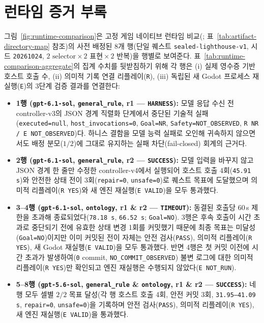 \documentclass[journal]{IEEEtran}
\begin{document}
\clearpage


\endgroup

\clearpage
\onecolumn
\appendices
\section{런타임 증거 부록}\label{app:runtime-evidence}
그림~\ref{fig:runtime-comparison}은 고정 게임 네이티브 런타임 비교(; 표~\ref{tab:artifact-directory-map} 참조)의 사전 배정된 8개 행(단일 퀘스트 \texttt{sealed-lighthouse-v1}, 시드 \texttt{20261024}, $2\text{ selector}\times 2\text{ 표현}\times 2\text{ 반복}$)을 행별로 보여준다. 표~\ref{tab:runtime-comparison-aggregate}의 집계 수치를 뒷받침하기 위해 각 행은 (i) 실제 영수증 기반 호스트 호출 수, (ii) 의미적 기록 연결 리플레이(\texttt{R}), (iii) 독립된 새 Godot 프로세스 재실행(\texttt{E})의 3단계 검증 결과를 연결한다:
\begin{itemize}
  \item \textbf{1행 (\texttt{gpt-6.1-sol}, \texttt{general\_rule}, r1 --- \texttt{HARNESS}):} 모델 응답 수신 전 controller-v3의 JSON 경계 직렬화 단계에서 중단된 기술적 실패(\texttt{executed=null}, \texttt{host\_invocations=0}, \texttt{Goal=NR}, \texttt{Safety=NOT\_OBSERVED}, \texttt{R NR / E NOT\_OBSERVED})다. 하니스 결함을 모델 능력 실패로 오인해 귀속하지 않으면서도 배정 분모($1/2$)에 그대로 유지하는 실패 차단(fail-closed) 회계의 근거다.
  \item \textbf{2행 (\texttt{gpt-6.1-sol}, \texttt{general\_rule}, r2 --- \texttt{SUCCESS}):} 모델 입력을 바꾸지 않고 JSON 경계 한 줄만 수정한 controller-v4에서 실행되어 호스트 호출 4회(\texttt{45.91\,s})와 안전한 상태 전이 3회(\texttt{repair=0}, \texttt{unsafe=0})로 퀘스트 목표에 도달했으며 의미적 리플레이(\texttt{R YES})와 새 엔진 재실행(\texttt{E VALID})을 모두 통과했다.
  \item \textbf{3--4행 (\texttt{gpt-6.1-sol}, \texttt{ontology}, r1 \& r2 --- \texttt{TIMEOUT}):} 동결된 호출당 60\,s 제한을 초과해 종료되었다(\texttt{78.18\,s}, \texttt{66.52\,s}; \texttt{Goal=NO}). 3행은 후속 호출이 시간 초과로 중단되기 전에 유효한 상태 변경 1회를 커밋했기 때문에 최종 목표는 미달성(\texttt{Goal=NO})이지만 이미 커밋된 전이 자체는 안전 검사(\texttt{PASS}), 의미적 리플레이(\texttt{R YES}), 새 Godot 재실행(\texttt{E VALID})을 모두 통과했다. 반면 4행은 첫 커밋 이전에 시간 초과가 발생하여(\texttt{0} commit, \texttt{NO\_COMMIT\_OBSERVED}) 불변 로그에 대한 의미적 리플레이(\texttt{R YES})만 확인되고 엔진 재실행은 수행되지 않았다(\texttt{E NOT\_RUN}).
  \item \textbf{5--8행 (\texttt{gpt-5.6-sol}, \texttt{general\_rule} \& \texttt{ontology}, r1 \& r2 --- \texttt{SUCCESS}):} 네 행 모두 셀별 $2/2$ 목표 달성(각 행 호스트 호출 4회, 안전 커밋 3회, \texttt{31.95--41.09\,s}, \texttt{repair=0}, \texttt{unsafe=0})을 기록하며 안전 검사(\texttt{PASS}), 의미적 리플레이(\texttt{R YES}), 새 엔진 재실행(\texttt{E VALID})을 통과했다.
\end{itemize}
\end{document}
